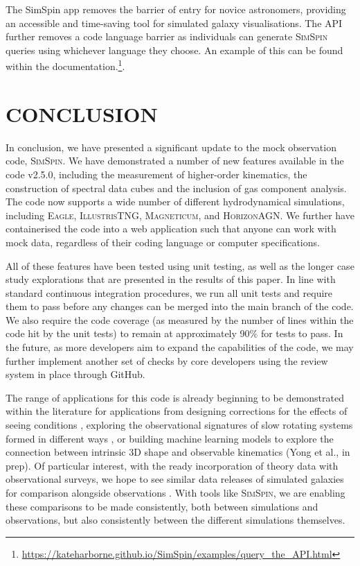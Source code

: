 \documentclass[
  journal=pasa,
  manuscript=research-paper, %
  year=2020,
  volume=37,
]{cup-journal}
\newcommand{\simspin}[1]{\textsc{SimSpin}#1} %
\newcommand{\ssversion}[1]{v2.5.0#1}
\newcommand{\eagle}[1]{\textsc{Eagle}#1} %
\newcommand{\magneticum}[1]{\textsc{Magneticum}#1} %
\newcommand{\illustristng}[1]{\textsc{IllustrisTNG}#1} %
\newcommand{\horizon}[1]{\textsc{HorizonAGN}#1} %
\begin{document}
The SimSpin app removes the barrier of entry for novice astronomers, providing an accessible and time-saving tool for simulated galaxy visualisations.
The API further removes a code language barrier as individuals can generate \simspin{} queries using whichever language they choose. 
An example of this can be found within the documentation.\footnote{\url{https://kateharborne.github.io/SimSpin/examples/query_the_API.html}}.

\section{CONCLUSION}

In conclusion, we have presented a significant update to the mock observation code, \simspin. 
We have demonstrated a number of new features available in the code \ssversion, including the measurement of higher-order kinematics, the construction of spectral data cubes and the inclusion of gas component analysis.
The code now supports a wide number of different hydrodynamical simulations, including \eagle, \illustristng, \magneticum, and \horizon. 
We further have containerised the code into a web application such that anyone can work with mock data, regardless of their coding language or computer specifications. 

All of these features have been tested using unit testing, as well as the longer case study explorations that are presented in the results of this paper. 
In line with standard continuous integration procedures, we run all unit tests and require them to pass before any changes can be merged into the main branch of the code. 
We also require the code coverage (as measured by the number of lines within the code hit by the unit tests) to remain at approximately 90\% for tests to pass. 
In the future, as more developers aim to expand the capabilities of the code, we may further implement another set of checks by core developers using the review system in place through GitHub. 

The range of applications for this code is already beginning to be demonstrated within the literature for applications from designing corrections for the effects of seeing conditions \citep{Harborne2020RecoveringData}, exploring the observational signatures of slow rotating systems formed in different ways \citep{Lagos2022Thesimulations}, or building machine learning models to explore the connection between intrinsic 3D shape and observable kinematics (Yong et al., in prep). 
Of particular interest, with the ready incorporation of theory data with observational surveys, we hope to see similar data releases of simulated galaxies for comparison alongside observations  \citep[such as is being prepared for the MAGPI survey as described in][]{Foster2021MAGPIOverview}. 
With tools like \simspin, we are enabling these comparisons to be made consistently, both between simulations and observations, but also consistently between the different simulations themselves. 
\end{document}
